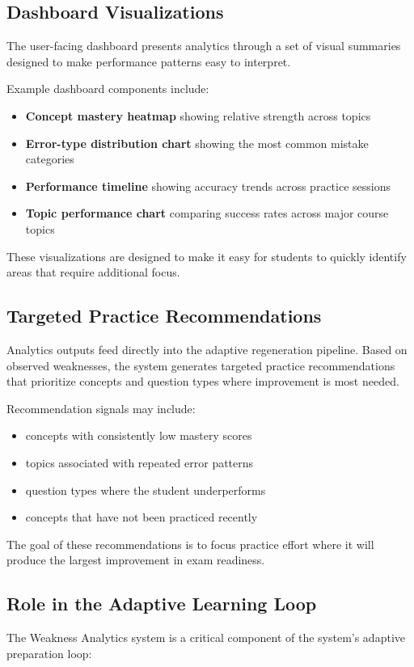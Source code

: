 \documentclass[11pt]{article}
\begin{document}
\subsection{Dashboard Visualizations}
The user-facing dashboard presents analytics through a set of visual summaries designed to make performance patterns easy to interpret.

Example dashboard components include:

\begin{itemize}
\item \textbf{Concept mastery heatmap} showing relative strength across topics
\item \textbf{Error-type distribution chart} showing the most common mistake categories
\item \textbf{Performance timeline} showing accuracy trends across practice sessions
\item \textbf{Topic performance chart} comparing success rates across major course topics
\end{itemize}

These visualizations are designed to make it easy for students to quickly identify areas that require additional focus.

\subsection{Targeted Practice Recommendations}
Analytics outputs feed directly into the adaptive regeneration pipeline. Based on observed weaknesses, the system generates targeted practice recommendations that prioritize concepts and question types where improvement is most needed.

Recommendation signals may include:

\begin{itemize}
\item concepts with consistently low mastery scores
\item topics associated with repeated error patterns
\item question types where the student underperforms
\item concepts that have not been practiced recently
\end{itemize}

The goal of these recommendations is to focus practice effort where it will produce the largest improvement in exam readiness.

\subsection{Role in the Adaptive Learning Loop}
The Weakness Analytics system is a critical component of the system's adaptive preparation loop:
\end{document}
